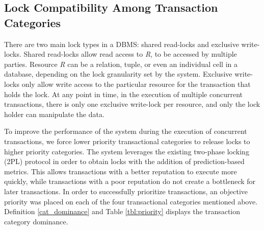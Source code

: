 \subsection{Lock Compatibility Among Transaction Categories}
\label{pbs:lock_compatibility}
There are two main lock types in a \ac{DBMS}: shared read-locks and exclusive write-locks. Shared read-locks allow read access to \textit{R}, to be accessed by multiple parties. Resource \textit{R} can be a relation, tuple, or even an individual cell in a database, depending on the lock granularity set by the system. Exclusive write-locks only allow write access to the particular resource for the transaction that holds the lock. At any point in time, in the execution of multiple concurrent transactions, there is only one exclusive write-lock per resource, and only the lock holder can manipulate the data.

To improve the performance of the system during the execution of concurrent transactions, we force lower priority transactional categories to release locks to higher priority categories. The system leverages the existing two-phase locking (\ac{2PL}) protocol in order to obtain locks with the addition of prediction-based metrics. This allows transactions with a better reputation to execute more quickly, while transactions with a poor reputation do not create a bottleneck for later transactions. In order to successfully prioritize transactions, an objective priority was placed on each of the four transactional categories mentioned above. Definition \ref{cat_dominance} and Table \ref{tbl:priority} displays the transaction category dominance.

